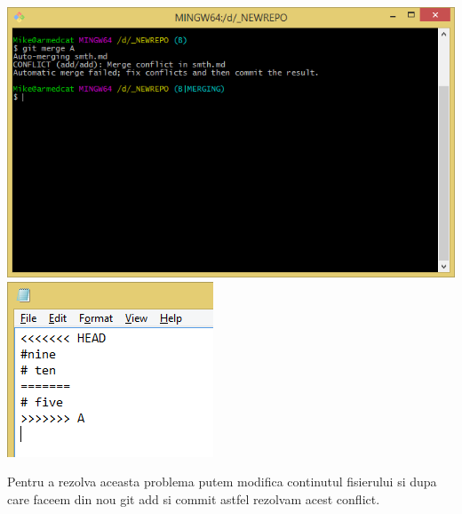 \begin{center}
\includegraphics[scale=0.7]{images/conflict}\\
\includegraphics[scale=0.7]{images/problem}\\
\end{center}
Pentru a rezolva aceasta problema putem modifica continutul fisierului si dupa care faceem din nou git add si commit astfel rezolvam acest conflict. 


\clearpage